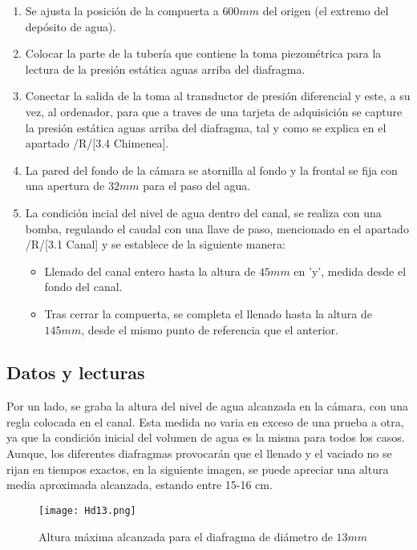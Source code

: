 \begin{enumerate}
\def\labelenumi{\arabic{enumi}.}
\item
  Se ajusta la posición de la compuerta a \(600mm\) del origen (el
  extremo del depósito de agua).
\item
  Colocar la parte de la tubería que contiene la toma piezométrica para
  la lectura de la presión estática aguas arriba del diafragma.
\item
  Conectar la salida de la toma al transductor de presión diferencial y
  este, a su vez, al ordenador, para que a traves de una tarjeta de
  adquisición se capture la presión estática aguas arriba del diafragma,
  tal y como se explica en el apartado /R/{[}3.4 Chimenea{]}.
\item
  La pared del fondo de la cámara se atornilla al fondo y la frontal se
  fija con una apertura de \(32mm\) para el paso del agua.
\item
  La condición incial del nivel de agua dentro del canal, se realiza con
  una bomba, regulando el caudal con una llave de paso, mencionado en el
  apartado /R/{[}3.1 Canal{]} y se establece de la siguiente manera:

  \begin{itemize}
  \item
    Llenado del canal entero hasta la altura de \(45mm\) en 'y', medida
    desde el fondo del canal.
  \item
    Tras cerrar la compuerta, se completa el llenado hasta la altura de
    \(145mm\), desde el mismo punto de referencia que el anterior.
  \end{itemize}
\end{enumerate}

\subsection{Datos y lecturas}\label{header-n544}

Por un lado, se graba la altura del nivel de agua alcanzada en la
cámara, con una regla colocada en el canal. Esta medida no varia en
exceso de una prueba a otra, ya que la condición inicial del volumen de
agua es la misma para todos los casos. Aunque, los diferentes diafragmas
provocarán que el llenado y el vaciado no se rijan en tiempos exactos,
en la siguiente imagen, se puede apreciar una altura media aproximada
alcanzada, estando entre 15-16 cm.

\begin{figure}
\centering
\texttt{[image: Hd13.png]}
\caption{Altura máxima alcanzada para el diafragma de diámetro de $13mm$}
\label{fig:Hd13}
\end{figure}

